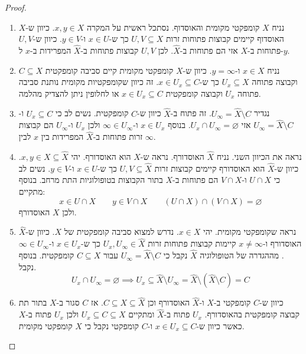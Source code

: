 \documentclass{tstextbook}
\begin{document}
\begin{proof}
  \begin{enumerate}
    \item נניח \(X\) קומפקטי מקומית והאוסדוף. נסתכל ראשית על המקרה \(x,y \in X\). כיוון ש-\(X\) האוסדוף קיימים קבוצות פתוחות זרות \(U,V\subseteq X\) כך ש-\(x \in U\) ו-\(y \in V\). כיוון ש-\(U,V\) פתוחות ב-\(X\) אזי הם פתוחות ב-\(\hat{X}\). לכן \(U,V\) קבוצות פתוחות ב-\(\hat{X}\) המפרידות ב-\(x\) ל-\(y\). 


    \item נניח \(x \in X\) ו-\(y = \infty\). כיוון ש-\(X\) קומפקטי מקומית קיים סביבה קומפקטית \(C \subseteq X\) וקבוצה פתוחה \(U_{x}\subseteq X\) כך ש-\(x \in U_{x} \subseteq C\). זה כיוון שקומפקטיות מקומית נותנת סביבה פתוחה \(U_{x}\) וקבוצה קומפקטית \(x \in U_{x}\subseteq C\) או לחלופין ניתן להצדיק מהלמה. 


    \item נגדיר \(U_{\infty}=\hat{X} \setminus C\). זה פתוח ב-\(\hat{X}\) כיוון ש-\(C\) קומפקטית. נשים לב כי \(U_{x}\subseteq C\) ו-\(U_{\infty}=\hat{X}\setminus C\) אזי \(U_{x}\cap U_{\infty}=\varnothing\). בנוסף \(x \in U_{x}\) ו-\(\infty \in U_{\infty}\) ולכן \(U_{x}\) ו-\(U_{\infty}\) הם קבוצות זרות פתוחות ב-\(\hat{X}\) המפרידות בין \(x\) לבין \(\infty\). 


    \item נראה את הכיוון השני. נניח \(\hat{X}\) האוסדורף. נראה ש-\(X\) הוא האוסדורף. יהי \(x,y \in X\subseteq \hat{X}\). כיוון ש-\(\hat{X}\) הוא האוסדורף קיימים קבוצות זרות \(U,V\subseteq \hat{X}\) כך ש-\(x \in U\) ו-\(y \in V\). נשים לב כי \(U\cap X\) ו-\(V \cap X\) הם פתוחות ב-\(X\) בתור הקבוצות בטופולוגיות התת מרחב. בנוסף מתקיים: 
$$x \in U\cap X\qquad  y \in V \cap X\qquad \left(U\cap X\right)\cap\left(V\cap X\right)=\varnothing $$
ולכן \(X\) האוסדורף.


    \item נראה שקומפקטי מקומית. יהי \(x \in X\). נדרש למצוא סביבה קומפקטית של \(X\). כיוון ש-\(\hat{X}\) האוסדורף ו-\(x \neq \infty\) קיימות קבוצות פתוחות זרות \(U_{x},U_{\infty}\in \hat{X}\) כך ש-\(x \in U_{x}\) ו-\(\infty \in U_{\infty}\). מההגדרה של הטופולוגיה \(\hat{X}\) נקבל כי \(U_{\infty}=\hat{X}\setminus C\) עבור \(C\subseteq X\) קומפקטית. בנוסף נקבל. 
$$U_{x}\cap U_{\infty}=\varnothing\implies U_{x}\subseteq\hat{X}\setminus U_{\infty}=\hat{X}\setminus(\hat{X}\setminus C)=C$$


    \item כיוון ש-\(C\) קומפקטי ב-\(X\) ו-\(\hat{X}\) האוסדורף וכן \(C\subseteq X\subseteq \hat{X}\). אז \(C\) סגור ב-\(X\) בתור תת קבוצה קומפקטית בהאוסדורף. \(U_{x}\) פתוח ב-\(\hat{X}\) ומתקיים \(U_{x}\subseteq C\subseteq X\) ולכן \(U_{x}\) פתוח ב-\(X\) כאשר כיוון ש-\(x \in U_{x}\subseteq C\) ו-\(C\) קומפקטי נקבל כי \(X\) קומפקטי מקומית. 


  \end{enumerate}
\end{proof}
\end{document}
